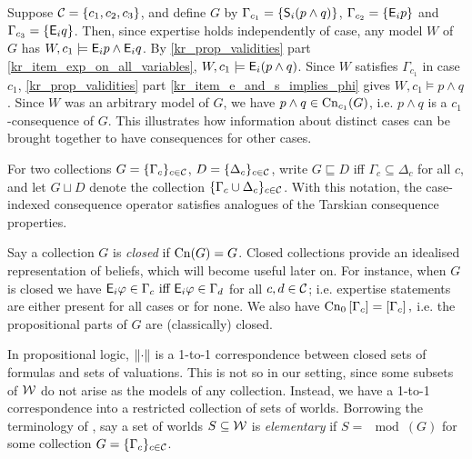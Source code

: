 \begin{example}
    Suppose $\C = \{c_1, c_2, c_3\}$, and define $G$ by $\Gamma_{c_1} = \{\S_i(p
    \land q)\}$, $\Gamma_{c_2} = \{\E_i{p}\}$ and $\Gamma_{c_3} = \{\E_i{q}\}$.
    Then, since expertise holds independently of case, any model $W$ of $G$ has
    $W, c_1 \models \E_i{p} \land \E_i{q}$. By \cref{kr_prop_validities} part
    \cref{kr_item_exp_on_all_variables}, $W, c_1 \models \E_i(p \land q)$.
    Since $W$ satisfies $\Gamma_{c_1}$ in case $c_1$, \cref{kr_prop_validities}
    part \cref{kr_item_e_and_s_implies_phi} gives $W, c_1 \models p \land
    q$. Since $W$ was an arbitrary model of $G$, we have $p \land q \in
    \cn_{c_1}(G)$, i.e. $p \land q$ is a $c_1$-consequence of $G$.
    This illustrates how information about distinct cases can be brought
    together to have consequences for other cases.

\end{example}

For two collections $G = \{\Gamma_c\}_{c \in \C}$, $D = \{\Delta_c\}_{c \in
\C}$, write $G \sqsubseteq D$ iff $\Gamma_c \subseteq \Delta_c$ for all $c$,
and let $G \sqcup D$ denote the collection $\{\Gamma_c \cup \Delta_c\}_{c \in
\C}$. With this notation, the case-indexed consequence operator satisfies
analogues of the Tarskian consequence properties.\footnotemark{}
%

Say a collection $G$ is \emph{closed} if $\cn(G) = G$. Closed collections
provide an idealised representation of beliefs, which will become useful later
on. For instance, when $G$ is closed we have
$
    \E_i\phi \in \Gamma_c \text{ iff } \E_i\phi \in \Gamma_d
$
for all $c, d \in \C$; i.e. expertise statements are either present for all
cases or for none. We also have
$
    \cnprop\proppart{\Gamma_c} = \proppart{\Gamma_c},
$
i.e. the propositional parts of $G$ are (classically) closed.

In propositional logic, $\propmods{\cdot}$ is a 1-to-1 correspondence between closed
sets of formulas and sets of valuations. This is not so in our setting, since
some subsets of $\W$ do not arise as the models of any collection. Instead, we
have a 1-to-1 correspondence into a restricted collection of sets of worlds.
%
Borrowing the terminology of
\textcite{delgrande2018general}, say a set of worlds $S \subseteq \W$ is
\emph{elementary} if ${S = \mod(G)}$ for some collection $G =
\{\Gamma_c\}_{c \in \C}$.\footnotemark{}

